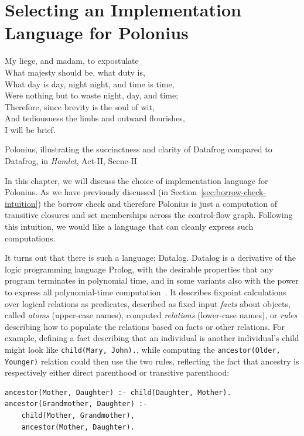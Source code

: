 \documentclass[11pt,a4paper,twoside,openany,draft]{report}
\newcommand{\InDatalog}[1]{\texttt{#1}}
\begin{document}
\chapter{Selecting an Implementation Language for Polonius}\label{cha:datalog}

\epigraph{My liege, and madam, to expostulate\\
  What majesty should be, what duty is,\\
  What day is day, night night, and time is time,\\
  Were nothing but to waste night, day, and time;\\
  Therefore, since brevity is the soul of wit,\\
  And tediousness the limbs and outward flourishes,\\
  I will be brief.}{Polonius, illustrating the succinctness and clarity of
  Datafrog compared to Datafrog, in \textit{Hamlet}, Act-II, Scene-II}

In this chapter, we will discuss the choice of implementation language for
Polonius. As we have previously discussed (in
Section~\ref{sec:borrow-check-intuition}) the borrow check and therefore
Polonius is just a computation of transitive closures and set memberships across
the control-flow graph. Following this intuition, we would like a language that
can cleanly express such computations.

It turns out that there is such a language; Datalog. Datalog is a derivative of
the logic programming language Prolog, with the desirable properties that any
program terminates in polynomial time, and in some variants also with the power
to express all polynomial-time computation~\cite{afrati_datalog_1995}. It
describes fixpoint calculations over logical relations as predicates, described
as fixed input \emph{facts} about objects, called \emph{atoms} (upper-case
names), computed \emph{relations} (lower-case names), or \emph{rules} describing
how to populate the relations based on facts or other relations. For example,
defining a fact describing that an individual is another individual's child
might look like \InDatalog{child(Mary, John).}, while computing the
\InDatalog{ancestor(Older, Younger)} relation could then use the two rules,
reflecting the fact that ancestry is respectively either direct parenthood or
transitive parenthood:
\begin{verbatim}
ancestor(Mother, Daughter) :- child(Daughter, Mother).
ancestor(Grandmother, Daughter) :- 
    child(Mother, Grandmother),
    ancestor(Mother, Daughter).
\end{verbatim}
\end{document}
